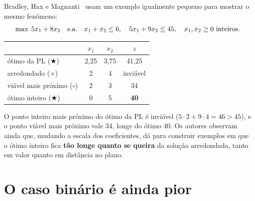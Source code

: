 Bradley, Hax e Magnanti~\cite[Seç.~9.4]{amp} usam um exemplo igualmente pequeno para mostrar o mesmo fenômeno:
\[
\max\; 5x_1+8x_2\quad\text{s.a.}\quad x_1+x_2\le6,\quad 5x_1+9x_2\le45,\quad x_1,x_2\ge0\text{ inteiros.}
\]
\begin{center}
\begin{minipage}{0.42\linewidth}
\centering
{}
\end{minipage}%
\begin{minipage}{0.56\linewidth}
\footnotesize
\begin{tabular}{lccc}
\toprule
& $x_1$ & $x_2$ & $z$\\
\midrule
ótimo da PL ({\color{red}$\bigstar$}) & 2,25 & 3,75 & 41,25\\
arredondado ($\times$) & 2 & 4 & inviável\\
viável mais próximo ($\circ$) & 2 & 3 & 34\\
ótimo inteiro ({\color{azul}$\bigstar$}) & 0 & 5 & \textbf{40}\\
\bottomrule
\end{tabular}
\end{minipage}
\end{center}
O ponto inteiro mais próximo do ótimo da PL é inviável ($5\cdot2+9\cdot4=46>45$), e o ponto viável mais próximo
vale 34, longe do ótimo 40. Os autores observam ainda que, mudando a escala dos coeficientes, dá para construir
exemplos em que o ótimo inteiro fica \textbf{tão longe quanto se queira} da solução arredondada, tanto em valor quanto
em distância no plano.

\section{O caso binário é ainda pior}
\label{sec:mochila3}

